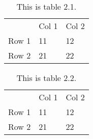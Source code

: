 \documentclass[]{book}
\begin{document}
\begin{table}[htbp] 
  \centering
    \begin{tabular}{lll}
    & Col 1 & Col 2 \\
    Row 1 & 11 & 12 \\
    Row 2 & 21 & 22 \\
    \end{tabular}
  \caption{This is table 2.1.}
\end{table}

\begin{table}[htbp] 
  \centering
    \begin{tabular}{lll}
    & Col 1 & Col 2 \\
    Row 1 & 11 & 12 \\
    Row 2 & 21 & 22 \\
    \end{tabular}
  \caption{This is table 2.2.}
\end{table}
\end{document}
